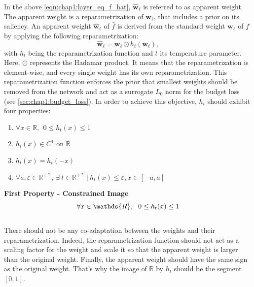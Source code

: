 \noindent In the above \cref{eqn:chap1:layer_eq_f_hat}, $\mathbf{\hat w}_\ell$
is referred to as apparent weight. The apparent weight is a reparametrization of
$\mathbf{w}_\ell$, that includes a prior on its saliency. An apparent weight
$\mathbf{\hat w}_\ell$ of $\hat{f}$ is derived from the standard weight
$\mathbf{w}_\ell$ of $f$ by applying the following reparametrization: 
\begin{equation}
  \label{eqn:reparam}
  \mathbf{\hat w}_\ell = \mathbf{w}_\ell  \odot h_t(\mathbf{w}_\ell),
\end{equation}
\noindent with $h_t$ being the reparametrization function and $t$ its
temperature parameter. Here, $\odot$ represents the Hadamar product. It means
that the reparametrization is element-wise, and every single weight has its own
reparametrization. This reparametrization function enforces the prior that
smallest weights should be removed from the network and act as a surrogate $L_0$
norm for the budget loss (see \cref{sec:chap1:budget_loss}). In order to achieve
this objective, $h_t$ should exhibit four properties: \\

\begin{enumerate}
  \item $\forall x \in \mathds{R},~~ 0 \leq h_t(x) \leq 1 $
  \item $h_t(x) \in C^1 \text{ on } \mathds{R}$
  \item $h_t(x) = h_t(-x)$
  \item $\forall a,\varepsilon \in\mathds{R}^{+\ast},~ \exists ~t
  \in\mathds{R}^{+\ast} ~ | ~ h_t(x) \leq \varepsilon, x \in [-a,a]$
\end{enumerate}

\noindent\textbf{First Property - Constrained Image} \\
\begin{equation}
    \centering
    \forall x \in \mathds{R},~~ 0 \leq h_t(x) \leq 1
    \label{eqn:chap1:reparam_prop1}
\end{equation}
\\
There should not be any co-adaptation between the weights and their
reparametrization. Indeed, the reparametrization function should not act as a
scaling factor for the weight and scale it so that the apparent weight is larger
than the original weight. Finally, the apparent weight should have the same sign
as the original weight. That's why the image of $\mathbb{R}$ by $h_t$ should be
the segment $[0,1]$.\\

